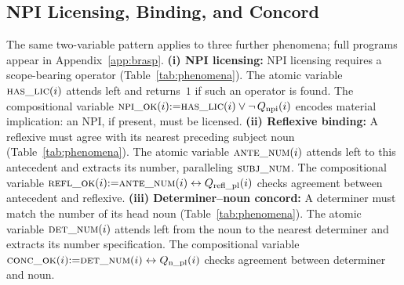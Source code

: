 \documentclass[11pt]{article}
\begin{document}
\subsection{NPI Licensing, Binding, and Concord}
\label{sec:three-more}

The same two-variable pattern applies to three further phenomena; full programs appear in Appendix~\ref{app:brasp}. \noindent\textbf{(i) NPI licensing:}
NPI licensing requires a scope-bearing operator (Table~\ref{tab:phenomena}).
The atomic variable $\textsc{has\_lic}(i)$ attends left and returns~$1$ if such an operator is found.
The compositional variable $\textsc{npi\_ok}(i) {:=} \textsc{has\_lic}(i) \lor \neg\, Q_\text{npi}(i)$ encodes material implication: an NPI, if present, must be licensed.
%
\textbf{(ii) Reflexive binding:}
A reflexive must agree with its nearest preceding subject noun (Table~\ref{tab:phenomena}).
The atomic variable $\textsc{ante\_num}(i)$ attends left to this antecedent and extracts its number, paralleling $\textsc{subj\_num}$.
The compositional variable $\textsc{refl\_ok}(i) {:=} \textsc{ante\_num}(i) \leftrightarrow Q_\text{refl\_pl}(i)$ checks agreement between antecedent and reflexive.
%
\textbf{(iii) Determiner--noun concord:}
A determiner must match the number of its head noun (Table~\ref{tab:phenomena}).
The atomic variable $\textsc{det\_num}(i)$ attends left from the noun to the nearest determiner and extracts its number specification.
The compositional variable $\textsc{conc\_ok}(i) {:=} \textsc{det\_num}(i) \leftrightarrow Q_\text{n\_pl}(i)$ checks agreement between determiner and noun.
\end{document}
